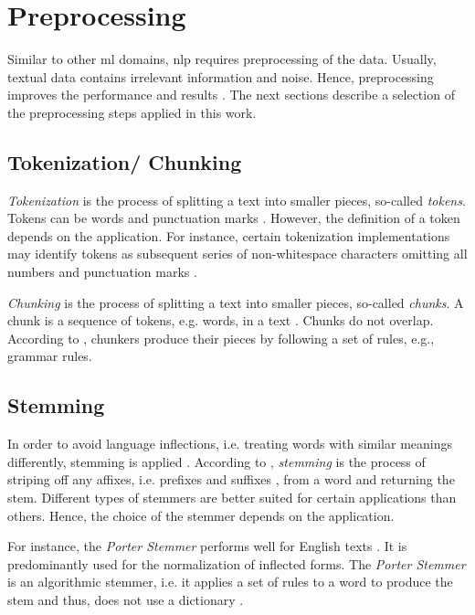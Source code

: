 \section{Preprocessing}\label{sec:preprocessing}

Similar to other \ac{ml} domains, \ac{nlp} requires preprocessing of the data.
Usually, textual data contains irrelevant information and noise.
Hence, preprocessing improves the performance and results \cite{clusteringDocs2020}.
The next sections describe a selection of the preprocessing steps applied in this work.


\subsection{Tokenization/ Chunking}\label{subsec:tokenization}

\textit{Tokenization} is the process of splitting a text into smaller pieces, so-called \textit{tokens}.
Tokens can be words and punctuation marks \cite{nlp-book2009}.
However, the definition of a token depends on the application.
For instance, certain tokenization implementations may identify tokens as subsequent series of non-whitespace characters omitting all numbers and punctuation marks \cite{IR2011}.

\textit{Chunking} is the process of splitting a text into smaller pieces, so-called \textit{chunks}.
A chunk is a sequence of tokens, e.g. words, in a text \cite{nlp-book2009}.
Chunks do not overlap.
According to \citeauthor{nlp-book2009}, chunkers produce their pieces by following a set of rules, e.g., grammar rules.

\subsection{Stemming}\label{subsec:stemming}

In order to avoid language inflections, i.e. treating words with similar meanings differently, stemming is applied \cite{clusteringDocs2020}.
According to \citeauthor{nlp-book2009}, \textit{stemming} is the process of striping off any affixes, i.e. prefixes and suffixes \cite{IR2011}, 
from a word and returning the stem.
Different types of stemmers are better suited for certain applications than others.
Hence, the choice of the stemmer depends on the application.

For instance, the \textit{Porter Stemmer} performs well for English texts \cite{nlp-book2009, clusteringDocs2020}.
It is predominantly used for the normalization of inflected forms.
The \textit{Porter Stemmer} is an algorithmic stemmer, 
i.e. it applies a set of rules to a word to produce the stem and thus, does not use a dictionary \cite{IR2011, clusteringDocs2020}.

